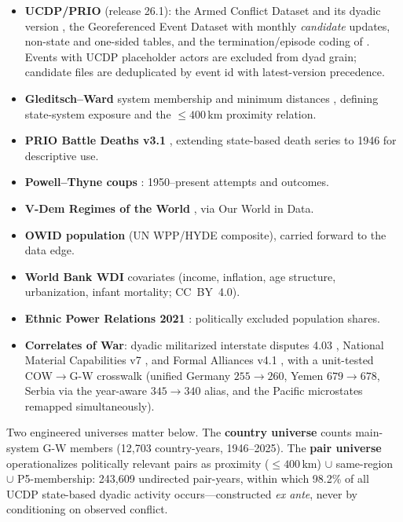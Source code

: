 \documentclass[11pt]{article}
\begin{document}
\begin{itemize}
\item \textbf{UCDP/PRIO} (release 26.1): the Armed Conflict Dataset and its
dyadic version \citep{gleditsch2002armed,davies2026organized}, the
Georeferenced Event Dataset \citep{sundberg2013introducing} with monthly
\emph{candidate} updates, non-state and one-sided tables, and the
termination/episode coding of \citet{kreutz2010how}. Events with UCDP
placeholder actors are excluded from dyad grain; candidate files are
deduplicated by event id with latest-version precedence.
\item \textbf{Gleditsch--Ward} system membership and minimum distances
\citep{gleditsch2001measuring}, defining state-system exposure and the
${\leq}400$\,km proximity relation.
\item \textbf{PRIO Battle Deaths v3.1} \citep{lacina2005monitoring},
extending state-based death series to 1946 for descriptive use.
\item \textbf{Powell--Thyne coups} \citep{powell2011global}: 1950--present
attempts and outcomes.
\item \textbf{V-Dem Regimes of the World} \citep{luhrmann2018regimes}, via
Our World in Data.
\item \textbf{OWID population} (UN WPP/HYDE composite), carried forward to
the data edge.
\item \textbf{World Bank WDI} covariates (income, inflation, age structure,
urbanization, infant mortality; CC~BY~4.0).
\item \textbf{Ethnic Power Relations 2021} \citep{vogt2015integrating}:
politically excluded population shares.
\item \textbf{Correlates of War}: dyadic militarized interstate disputes 4.03
\citep{maoz2019dyadic,palmer2022mid5}, National Material Capabilities v7
\citep{singer1972capability}, and Formal Alliances v4.1
\citep{gibler2009international}, with a unit-tested COW${\to}$G-W crosswalk
(unified Germany $255{\to}260$, Yemen $679{\to}678$, Serbia via the
year-aware $345{\to}340$ alias, and the Pacific microstates remapped
simultaneously).
\end{itemize}

Two engineered universes matter below. The \textbf{country universe} counts
main-system G-W members (12{,}703 country-years, 1946--2025). The
\textbf{pair universe} operationalizes politically relevant pairs as
proximity (${\leq}400$\,km) $\cup$ same-region $\cup$ P5-membership: 243{,}609
undirected pair-years, within which 98.2\% of all UCDP state-based dyadic
activity occurs---constructed \emph{ex ante}, never by conditioning on
observed conflict.
\end{document}
